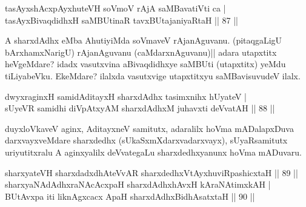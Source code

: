 
\begin{shl}
tasAyxshAcxpAyxhuteVH soVmoV rAjA saMBavatiVti ca | \\
tasAyxBivaqdidhxH saMBUtinaR tavxBUtajaniyaRtaH \hfill|| 87 || 
\end{shl}

\begin{artha}
A sharxdAdhx eMba AhutiyiMda soVmaveV rAjanAguvanu. (pitaqgaLigU bArxhamxNarigU) rAjanAguvanu (caMdarxnAguvanu)|| adara utapxtitx heVgeMdare? idadx vasutxvina aBivaqdidhxye saMBUti (utapxtitx) yeMdu tiLiyabeVku. EkeMdare? ilalxda vasutxvige utapxtitxyu saMBavisuvudeV ilalx.
\end{artha}


\begin{shl}
dwyxraginxH samidAditayxH sharxdAdhx tasimxnihx hUyateV | \\
sUyeVR samidhi diVpAtxyAM sharxdAdhxM juhavxti deVvatAH \hfill|| 88 || 
\end{shl}

\begin{artha}
duyxloVkaveV aginx, AditayxneV samitutx, adaralilx hoVma mADalapxDuva 
darxvayxveMdare sharxdedhx (sUkaSxmXdarxvadarxvayx), sUyaRsamitutx 
uriyutitxralu A aginxyalilx deVvategaLu sharxdedhxyanunx hoVma mADuvaru.
\end{artha}


\begin{shl}
sharxyateVH sharxdadxdhAteVvAR sharxdedhxVtAyxhuviRpashicxtaH \hfill|| 89 || \\
\footnotemark[1]sharxyaNAdAdhxraNAcAcx\s \s paH sharxdAdhxhAvxH kAraNAtimxkAH | \\
BUtAvx\s \s pa iti liknAgxcacx ApaH sharxdAdhxBidhAsatxtaH \hfill|| 90 || 
\end{shl}

